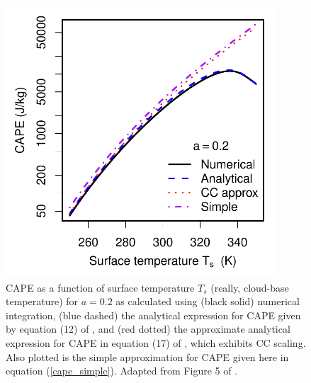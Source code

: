 \documentclass[12pt]{article}
\begin{document}
\begin{figure}
\begin{center}
\includegraphics[width=4in]{../figures/17leshouches_cape.pdf}
\caption{CAPE as a function of surface temperature $T_s$ (really, cloud-base temperature) for $a=0.2$ as calculated using (black solid) numerical integration, (blue dashed) the analytical expression for CAPE given by equation (12) of \citet{15cape}, and (red dotted) the approximate analytical expression for CAPE in equation (17) of \citet{15cape}, which exhibits CC scaling.  Also plotted is the simple approximation for CAPE given here in equation (\ref{cape_simple}).  Adapted from Figure 5 of \citet{15cape}.}
\label{17leshouches_cape}
\end{center}
\end{figure}




\clearpage

\end{document}
